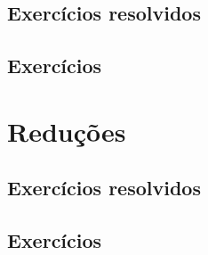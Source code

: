 \subsection* {Exercícios resolvidos}

\emconstrucao

\subsection* {Exercícios}

\emconstrucao

\section {Reduções} \label {cap_mpi_sec_redu}

\emconstrucao

\subsection* {Exercícios resolvidos}

\emconstrucao

\subsection* {Exercícios}

\emconstrucao